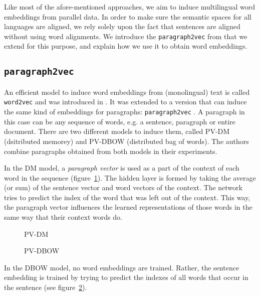 Like most of the afore-mentioned approaches, we aim to induce multilingual word embeddings from parallel data. In order to make sure the semantic spaces for all languages are aligned, we rely solely upon the fact that sentences are aligned without using word alignments.
We introduce the \texttt{paragraph2vec} from \cite{Le2014} that we extend for this purpose, and explain how we use it to obtain word embeddings.


\subsection{\texttt{paragraph2vec}}
An efficient model to induce word embeddings from (monolingual) text is called \texttt{word2vec}  and was introduced in \cite{mikolov2013efficient}. It was extended to a version that can induce the same kind of embeddings for paragraphs: \texttt{paragraph2vec} \cite{Le2014}. A paragraph in this case can be any sequence of words, e.g. a sentence, paragraph or entire document. There are two different models to induce them, called PV-DM (dsitributed memorey) and PV-DBOW (distributed bag of words). The authors combine paragraphs obtained from both models in their experiments.

In the DM model, a \emph{paragraph vector} is used as a part of the context of each word in the sequence (figure~\ref{fig:p2v-DM}).
The hidden layer is formed by taking the average (or sum) of the sentence vector and word vectors of the context. The network tries to predict the index of the word that was left out of the context.  
This way, the paragraph vector influences the learned representations of those words in the same way that their context words do.

\begin{figure*}\center
\begin{subfigure}{.45\textwidth}\center

\caption{PV-DM}
\label{fig:p2v-DM}
\end{subfigure}
\begin{subfigure}{.45\textwidth}\center

\caption{PV-DBOW}
\label{fig:p2v-DBOW}
\end{subfigure}
\caption{\texttt{paragraph2vec} models}
\end{figure*}

In the DBOW model, no word embeddings are trained. Rather, the sentence embedding is trained by trying to predict the indexes of all words that occur in the sentence (see figure~\ref{fig:p2v-DBOW}).





